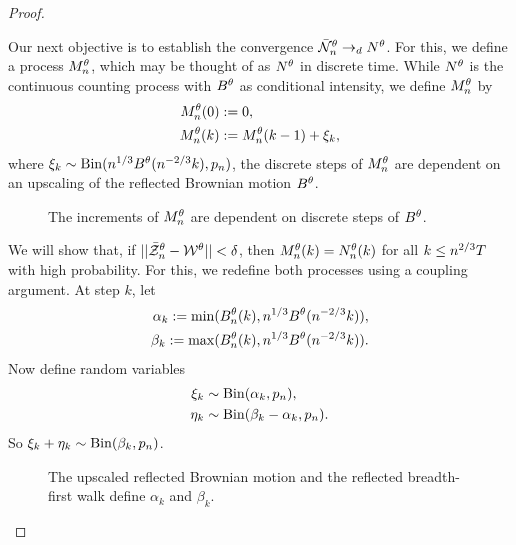 \begin{proof}

\begin{proofpart}
Our next objective is to establish the convergence $\bar{\mathcal{N}}_n^{\theta} \rightarrow_d N^{\theta}$.
For this, we define a process $M_n^{\theta}$, which may be thought of as $N^{\theta}$ in discrete time.
While $N^{\theta}$ is the continuous counting process with $B^{\theta}$ as conditional intensity,
we define $M_n^{\theta}$ by
\begin{equation}
\begin{aligned}
M_n^{\theta}(0) &:= 0, \\
M_n^{\theta}(k) &:= M_n^{\theta}(k-1) + \xi_k, 
\end{aligned}
\end{equation}
where $\xi_k \sim \operatorname*{Bin}(n^{1 / 3}B^{\theta}(n^{-2 / 3}k), p_n)$,
the discrete steps of $M_n^{\theta}$ are dependent on an upscaling of the reflected Brownian motion $B^{\theta}$.

\begin{figure}[ht]
	\centering
	
	\caption{The increments of $M_n^{\theta}$ are dependent on discrete steps of $B^{\theta}$.} 
	\label{F: Mn}
\end{figure}

We will show that, if $||\bar{\mathcal{Z}}^{\theta}_n - \mathcal{W}^{\theta}|| < \delta$, 
then $M_n^{\theta}(k) = N_n^{\theta}(k)$ for all $k \leq n^{2 / 3}T$ with high probability.
For this, we redefine both processes using a coupling argument.
At step $k$, let
\begin{equation} \label{E: def alpha beta}
\begin{aligned}
\alpha_k := \min(B_n^{\theta}(k), n^{1 / 3}B^{\theta}(n^{-2 / 3}k)), \\
\beta_k := \max(B_n^{\theta}(k), n^{1 / 3}B^{\theta}(n^{-2 / 3}k)).
\end{aligned}
\end{equation}
Now define random variables
\begin{equation} \label{E: def xi eta}
\begin{aligned}
\xi_k &\sim \operatorname*{Bin}(\alpha_k, p_n), \\
\eta_k &\sim \operatorname*{Bin}(\beta_k - \alpha_k, p_n).
\end{aligned}
\end{equation}
So $\xi_k + \eta_k \sim \operatorname*{Bin}(\beta_k, p_n)$.

\begin{figure}[ht]
	\centering
	
	\caption{The upscaled reflected Brownian motion and the reflected breadth-first walk define $\alpha_k$ and $\beta_k$.} 
	\label{F: BM BF-walk}
\end{figure}


\end{proofpart}
\end{proof}
